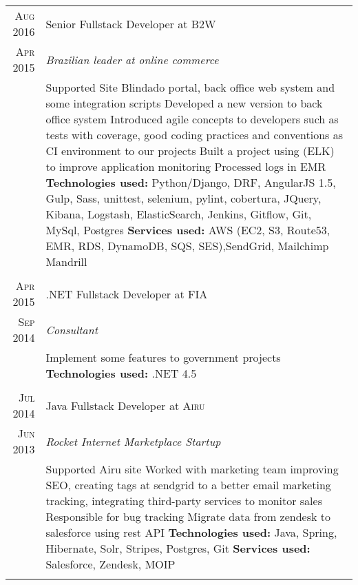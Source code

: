 \documentclass[a4paper,10pt]{article}
\begin{document}
\begin{tabular}{r|p{11cm}}

 \textsc{Aug 2016} & Senior Fullstack Developer at \textsc{B2W} \\\textsc{Apr 2015}&\emph{Brazilian leader at online commerce }\\&\footnotesize{
  Supported Site Blindado portal, back office web system and some integration scripts\newline
  Developed a new version to back office system\newline
    Introduced agile concepts to developers such as tests with coverage, good coding practices and conventions as CI environment to our projects\newline 
	Built a project using (ELK) to improve application monitoring\newline
    Processed logs in EMR\newline    
\textbf{Technologies used:} Python/Django, DRF, AngularJS 1.5, Gulp, Sass, unittest, selenium, pylint, cobertura, JQuery, Kibana, Logstash, ElasticSearch, Jenkins, Gitflow, Git, MySql, Postgres\newline
\textbf{Services used:} AWS (EC2, S3, Route53, EMR, RDS, DynamoDB, SQS, SES),SendGrid, Mailchimp Mandrill}\\\multicolumn{2}{c}{} \\


\textsc{Apr 2015}  & .NET Fullstack Developer at \textsc{FIA} \\
\textsc{Sep 2014}&\emph{Consultant}\\&\footnotesize{
Implement some features to government projects\newline
\textbf{Technologies used:} .NET 4.5
 }\\\multicolumn{2}{c}{} \\

	
\textsc{Jul 2014} & Java Fullstack Developer at \textsc{Airu} \\\textsc{Jun 2013}&\emph{Rocket Internet Marketplace Startup}\\&\footnotesize{ 
    Supported Airu site\newline
    Worked with marketing team improving SEO, creating tags at sendgrid to a better email marketing tracking, integrating third-party services to monitor sales\newline
    Responsible for bug tracking\newline
    Migrate data from zendesk to salesforce using rest API\newline
\textbf{Technologies used:} Java, Spring, Hibernate, Solr, Stripes, Postgres, Git\newline
\textbf{Services used:} Salesforce, Zendesk, MOIP
 }\\\multicolumn{2}{c}{} \\


\end{tabular}
\end{document}
